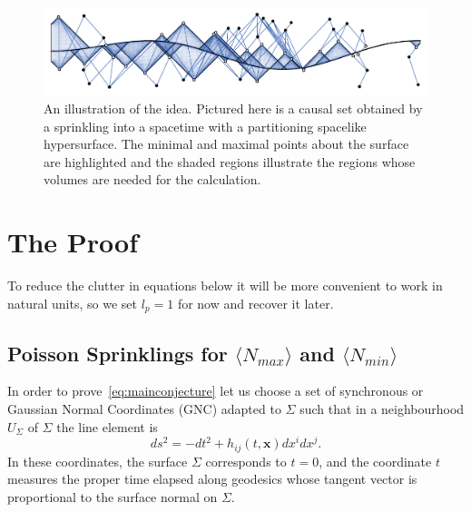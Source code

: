 \documentclass[12pt]{article}
\newcommand{\be}{\begin{equation}}
\newcommand{\ee}{\end{equation}}
\begin{document}
\begin{figure}
  \centering
    \includegraphics[width=\textwidth]{minmaxplot}
     \caption{An illustration of the idea. Pictured here is a causal set obtained by a sprinkling into a spacetime with a partitioning spacelike hypersurface. The minimal and maximal points about the surface are highlighted and the shaded regions illustrate the regions whose volumes are needed for the calculation.}
     \label{fig:Nmin_Nmax}
\end{figure}

\section{The Proof}
To reduce the clutter in equations below it will be more convenient to work in natural units, so we set $l_p=1$ for now and recover it later.

\subsection{Poisson Sprinklings for $\langle N_{max}\rangle$ and $\langle N_{min}\rangle$}

In order to prove~\eqref{eq:mainconjecture} let us choose a set of synchronous or Gaussian Normal Coordinates (GNC) adapted to $\Sigma$ such that in a neighbourhood $U_\Sigma$ of $\Sigma$ the line element is
\be
ds^2 = -dt^2 + h_{ij}(t,\mathbf x) dx^i dx^j.
\ee
In these coordinates, the surface $\Sigma$ corresponds to $t=0$, and the coordinate $t$ measures the proper time elapsed along geodesics whose tangent vector is proportional to the surface normal on $\Sigma$.
\end{document}
